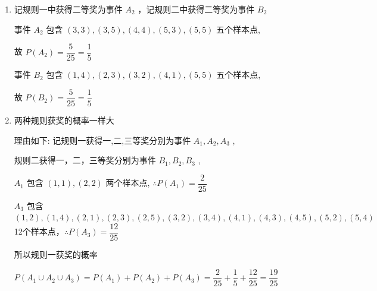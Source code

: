 \begin{enumerate}
\begin{enumerate}
\begin{jieda}
\begin{enumerate}
                $\left( {3,1}\right) ,\left( {3,2}\right) ,\left( {3,3}\right) ,\left( {3,4}\right) ,\left( {3,5}\right)$ ,
                
                $\left( {4,1}\right) ,\left( {4,2}\right) ,\left( {4,3}\right) ,\left( {4,4}\right) ,\left( {4,5}\right)$ ,
                
                $\left( {5,1}\right) ,\left( {5,2}\right) ,\left( {5,3}\right) ,\left( {5,4}\right) ,\left( {5,5}\right)$ 
                \item 记规则一中获得二等奖为事件 ${A}_{2}$ ，记规则二中获得二等奖为事件 ${B}_{2}$
                
                事件 ${A}_{2}$ 包含 $\left( {3,3}\right) ,\left( {3,5}\right) ,\left( {4,4}\right) ,\left( {5,3}\right) ,\left( {5,5}\right)$ 五个样本点,
                
                故 $P\left( {A}_{2}\right)  = \dfrac{5}{25} = \dfrac{1}{5}$
                
                事件 ${B}_{2}$ 包含 $\left( {1,4}\right) ,\left( {2,3}\right) ,\left( {3,2}\right) ,\left( {4,1}\right) ,\left( {5,5}\right)$ 五个样本点,
                
                故 $P\left( {B}_{2}\right)  = \dfrac{5}{25} = \dfrac{1}{5}$
                \item 两种规则获奖的概率一样大

                理由如下: 记规则一获得一,二,三等奖分别为事件 ${A}_{1},{A}_{2},{A}_{3}$ ,
                
                规则二获得一，二，三等奖分别为事件 ${B}_{1},{B}_{2},{B}_{3}$ ,
                
                ${A}_{1}$ 包含 $\left( {1,1}\right) ,\left( {2,2}\right)$ 两个样本点, $\therefore P\left( {A}_{1}\right)  = \dfrac{2}{25}$
                
                ${A}_{3}$ 包含 $\left( {1,2}\right) ,\left( {1,4}\right) ,\left( {2,1}\right) ,\left( {2,3}\right) ,\left( {2,5}\right) ,\left( {3,2}\right) ,\left( {3,4}\right) ,\left( {4,1}\right) ,\left( {4,3}\right) ,\left( {4,5}\right) ,\left( {5,2}\right) ,\left( {5,4}\right)$ 12个样本点，$\therefore P\left( {A}_{3}\right)  = \dfrac{12}{25}$
                
                所以规则一获奖的概率
                
                $P\left( {{A}_{1} \cup {A}_{2} \cup {A}_{3}}\right)  = P\left( {A}_{1}\right)  + P\left( {A}_{2}\right)  + P\left( {A}_{3}\right)  = \dfrac{2}{25} + \dfrac{1}{5} + \dfrac{12}{25} = \dfrac{19}{25}$
                

\end{enumerate}
\end{jieda}
\end{enumerate}
\end{enumerate}
